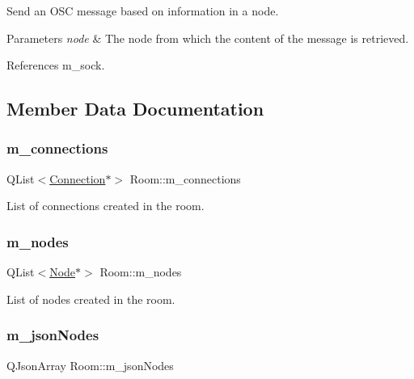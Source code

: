Send an O\+SC message based on information in a node. 


\begin{DoxyParams}{Parameters}
{\em node} & The node from which the content of the message is retrieved. \\
\hline
\end{DoxyParams}


References m\+\_\+sock.



\subsection{Member Data Documentation}
\mbox{\label{classRoom_ad63f36cb6664087c6c74dddeb032e711}} 
\subsubsection{\texorpdfstring{m\+\_\+connections}{m\_connections}}
{\footnotesize\ttfamily Q\+List$<$\mbox{\hyperlink{classConnection}{Connection}}$\ast$$>$ Room\+::m\+\_\+connections\hspace{0.3cm}{\ttfamily [private]}}

List of connections created in the room. \mbox{\label{classRoom_ab5be7998bc742a4bf931c81f044d7aae}} 
\subsubsection{\texorpdfstring{m\+\_\+nodes}{m\_nodes}}
{\footnotesize\ttfamily Q\+List$<$\mbox{\hyperlink{classNode}{Node}}$\ast$$>$ Room\+::m\+\_\+nodes\hspace{0.3cm}{\ttfamily [private]}}

List of nodes created in the room. \mbox{\label{classRoom_a98b8568422738036941daf95be83a9e3}} 
\subsubsection{\texorpdfstring{m\+\_\+json\+Nodes}{m\_jsonNodes}}
{\footnotesize\ttfamily Q\+Json\+Array Room\+::m\+\_\+json\+Nodes\hspace{0.3cm}{\ttfamily [private]}}

